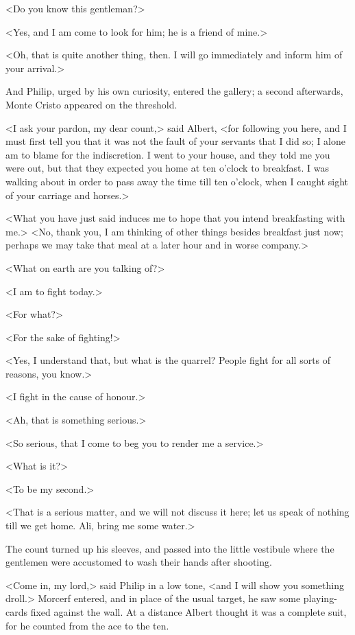  <Do you know this gentleman?> 

 <Yes, and I am come to look for him; he is a friend of mine.> 

 <Oh, that is quite another thing, then. I will go immediately and inform him of your arrival.> 

 And Philip, urged by his own curiosity, entered the gallery; a second afterwards, Monte Cristo appeared on the threshold. 

 <I ask your pardon, my dear count,> said Albert, <for following you here, and I must first tell you that it was not the fault of your servants that I did so; I alone am to blame for the indiscretion. I went to your house, and they told me you were out, but that they expected you home at ten o'clock to breakfast. I was walking about in order to pass away the time till ten o'clock, when I caught sight of your carriage and horses.> 

 <What you have just said induces me to hope that you intend breakfasting with me.>  <No, thank you, I am thinking of other things besides breakfast just now; perhaps we may take that meal at a later hour and in worse company.> 

 <What on earth are you talking of?> 

 <I am to fight today.> 

 <For what?> 

 <For the sake of fighting!> 

 <Yes, I understand that, but what is the quarrel? People fight for all sorts of reasons, you know.> 

 <I fight in the cause of honour.> 

 <Ah, that is something serious.> 

 <So serious, that I come to beg you to render me a service.> 

 <What is it?> 

 <To be my second.> 

 <That is a serious matter, and we will not discuss it here; let us speak of nothing till we get home. Ali, bring me some water.> 

 The count turned up his sleeves, and passed into the little vestibule where the gentlemen were accustomed to wash their hands after shooting. 

 <Come in, my lord,> said Philip in a low tone, <and I will show you something droll.> Morcerf entered, and in place of the usual target, he saw some playing-cards fixed against the wall. At a distance Albert thought it was a complete suit, for he counted from the ace to the ten. 


